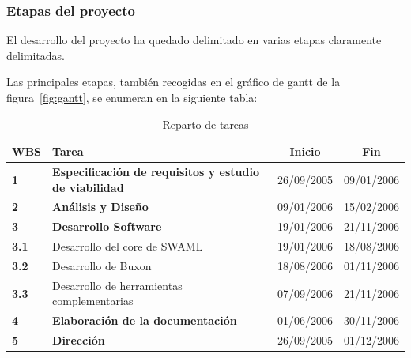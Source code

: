 \subsubsection{Etapas del proyecto}

El desarrollo del proyecto ha quedado delimitado en varias etapas claramente
delimitadas.

Las principales etapas, también recogidas en el gráfico de gantt de la 
figura~\ref{fig:gantt}, se enumeran en la siguiente tabla:


\begin{table}[H]
 \begin{center}
  \begin{tabular}{|l|l|c|c|}
	\hline
	\textbf{WBS} & \textbf{Tarea} & \textbf{Inicio} & \textbf{Fin} \\
	\hline
	\textbf{1}   & \textbf{Especificación de requisitos y estudio de viabilidad} & 26/09/2005 & 09/01/2006 \\
	\hline
	\textbf{2}   & \textbf{Análisis y Diseño} & 09/01/2006 & 15/02/2006 \\
	\hline
	\textbf{3}   & \textbf{Desarrollo Software} & 19/01/2006 & 21/11/2006 \\
	\textbf{3.1} & Desarrollo del core de SWAML & 19/01/2006 & 18/08/2006 \\	
	\textbf{3.2} & Desarrollo de Buxon & 18/08/2006 & 01/11/2006 \\
	\textbf{3.3} & Desarrollo de herramientas complementarias & 07/09/2006 & 21/11/2006 \\	
	\hline
	\textbf{4}   & \textbf{Elaboración de la documentación} & 01/06/2006 & 30/11/2006 \\	
	\hline
	\textbf{5}   & \textbf{Dirección} & 26/09/2005 & 01/12/2006 \\
	\hline
  \end{tabular}
  \caption{Reparto de tareas}
 \end{center}
\end{table}

